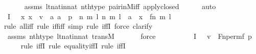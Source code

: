\begin{isabellebody}
\ \ \ \ \isamarkupfalse%
\ assms\ lt{\isacharunderscore}{\kern0pt}nat{\isacharunderscore}{\kern0pt}in{\isacharunderscore}{\kern0pt}nat\ nth{\isacharunderscore}{\kern0pt}type\ pair{\isacharunderscore}{\kern0pt}in{\isacharunderscore}{\kern0pt}M{\isacharunderscore}{\kern0pt}iff\ apply{\isacharunderscore}{\kern0pt}closed\isanewline
\ \ \ \ \isamarkupfalse%
\ auto\isanewline
\ \ \isamarkupfalse%
\ I{}{\isacharcolon}{\kern0pt}\ {\isachardoublequoteopen}{\isachardot}{\kern0pt}{\isachardot}{\kern0pt}{\isachardot}{\kern0pt}\ {\isasymlongleftrightarrow}\ {\isacharparenleft}{\kern0pt}{\isasymforall}x{\isachardot}{\kern0pt}\ x\ {\isasymin}\ v\ {\isasymlongleftrightarrow}\ {\isacharparenleft}{\kern0pt}{\isasymexists}a{\isachardot}{\kern0pt}\ a\ {\isasymin}\ p\ {\isasymand}\ {\isacharparenleft}{\kern0pt}{\isasymexists}n\ m\ l{\isachardot}{\kern0pt}\ {\isacharless}{\kern0pt}{\isacharless}{\kern0pt}n{\isacharcomma}{\kern0pt}\ m{\isachargreater}{\kern0pt}{\isacharcomma}{\kern0pt}\ l{\isachargreater}{\kern0pt}\ {\isacharequal}{\kern0pt}\ a\ {\isasymand}\ x\ {\isacharequal}{\kern0pt}\ {\isacharless}{\kern0pt}{\isacharless}{\kern0pt}f{\isacharbackquote}{\kern0pt}n{\isacharcomma}{\kern0pt}\ m{\isachargreater}{\kern0pt}{\isacharcomma}{\kern0pt}\ l{\isachargreater}{\kern0pt}{\isacharparenright}{\kern0pt}{\isacharparenright}{\kern0pt}{\isacharparenright}{\kern0pt}{\isachardoublequoteclose}\ \ \isanewline
\ \ \ \ \isamarkupfalse%
{\isacharparenleft}{\kern0pt}rule\ all{\isacharunderscore}{\kern0pt}iff{\isacharcomma}{\kern0pt}\ rule\ iff{\isacharunderscore}{\kern0pt}iff{\isacharcomma}{\kern0pt}\ simp{\isacharcomma}{\kern0pt}\ rule\ iffI{\isacharcomma}{\kern0pt}\ force{\isacharcomma}{\kern0pt}\ clarify{\isacharparenright}{\kern0pt}\isanewline
\ \ \ \ \isamarkupfalse%
\ assms\ nth{\isacharunderscore}{\kern0pt}type\ lt{\isacharunderscore}{\kern0pt}nat{\isacharunderscore}{\kern0pt}in{\isacharunderscore}{\kern0pt}nat\ transM\ \isanewline
\ \ \ \ \isamarkupfalse%
\ force\isanewline
\ \ \ \ \isamarkupfalse%
\ \isanewline
\ \ \isamarkupfalse%
\ I{}{\isacharcolon}{\kern0pt}\ {\isachardoublequoteopen}{\isachardot}{\kern0pt}{\isachardot}{\kern0pt}{\isachardot}{\kern0pt}\ {\isasymlongleftrightarrow}\ v\ {\isacharequal}{\kern0pt}\ Fn{\isacharunderscore}{\kern0pt}perm{\isacharparenleft}{\kern0pt}f{\isacharcomma}{\kern0pt}\ p{\isacharparenright}{\kern0pt}{\isachardoublequoteclose}\isanewline
\ \ \ \ \isamarkupfalse%
{\isacharparenleft}{\kern0pt}rule\ iffI{\isacharcomma}{\kern0pt}\ rule\ equality{\isacharunderscore}{\kern0pt}iffI{\isacharcomma}{\kern0pt}\ rule\ iffI{\isacharparenright}{\kern0pt}\isanewline

\end{isabellebody}
